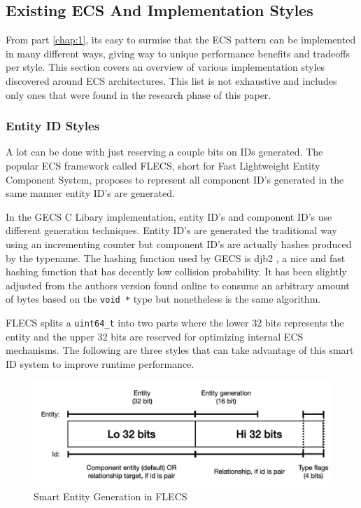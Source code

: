 \subsection{Existing ECS And Implementation Styles}
From part \ref{chap:1}, its easy to surmise that the ECS pattern can be implemented in many different ways, giving way to unique performance benefits and tradeoffs per style. This section covers an overview of various implementation styles discovered around ECS architectures. This list is not exhaustive and includes only ones that were found in the research phase of this paper. 

\subsubsection{Entity ID Styles}
A lot can be done with just reserving a couple bits on IDs generated. The popular ECS framework called FLECS, short for Fast Lightweight Entity Component System, proposes to represent all component ID's generated in the same manner entity ID's are generated. 

In the GECS C Libary implementation, entity ID's and component ID's use different generation techniques. Entity ID's are generated the traditional way using an incrementing counter but component ID's are actually hashes produced by the typename. The hashing function used by GECS is djb2 \cite{hashing}, a nice and fast hashing function that has decently low collision probability. It has been slightly adjusted from the authors version found online to consume an arbitrary amount of bytes based on the \texttt{void *} type but nonetheless is the same algorithm. 

FLECS splits a \texttt{uint64\_t} into two parts where the lower 32 bits represents the entity and the upper 32 bits are reserved for optimizing internal ECS mechanisms. The following are three styles that can take advantage of this smart ID system to improve runtime performance.

\begin{figure}[H]
    \centering
    \includegraphics[width=0.5\linewidth]{resources/entity_generation.png}
    \caption{Smart Entity Generation in FLECS}
    \label{fig:entity_generation}
\end{figure}

